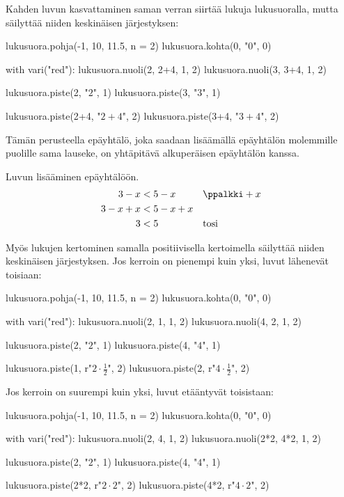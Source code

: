 Kahden luvun kasvattaminen saman verran siirtää lukuja lukusuoralla, mutta säilyttää niiden keskinäisen järjestyksen:

\begin{kuva}
lukusuora.pohja(-1, 10, 11.5, n = 2)
lukusuora.kohta(0, "$0$", 0)

with vari("red"):
	lukusuora.nuoli(2, 2+4, 1, 2)
	lukusuora.nuoli(3, 3+4, 1, 2)

lukusuora.piste(2, "$2$", 1)
lukusuora.piste(3, "$3$", 1)

lukusuora.piste(2+4, "$2\!+\!4$", 2)
lukusuora.piste(3+4, "$3\!+\!4$", 2)
\end{kuva}

Tämän perusteella epäyhtälö, joka saadaan lisäämällä epäyhtälön molemmille puolille sama lauseke, on yhtäpitävä alkuperäisen epäyhtälön kanssa.

\begin{esimerkki}
Luvun lisääminen epäyhtälöön.
  \begin{align*}
     3 - x &< 5 - x && \ppalkki +x\\
     3 -x +x &< 5 -x +x \\
     3 &< 5 && \textrm{tosi}
  \end{align*}
\end{esimerkki}

Myös lukujen kertominen samalla positiivisella kertoimella säilyttää niiden keskinäisen järjestyksen. Jos kerroin on pienempi kuin yksi, luvut lähenevät toisiaan:

\begin{kuva}
lukusuora.pohja(-1, 10, 11.5, n = 2)
lukusuora.kohta(0, "$0$", 0)

with vari("red"):
	lukusuora.nuoli(2, 1, 1, 2)
	lukusuora.nuoli(4, 2, 1, 2)

lukusuora.piste(2, "$2$", 1)
lukusuora.piste(4, "$4$", 1)

lukusuora.piste(1, r"$2 \cdot \frac{1}{2}$", 2)
lukusuora.piste(2, r"$4 \cdot \frac{1}{2}$", 2)
\end{kuva}

Jos kerroin on suurempi kuin yksi, luvut etääntyvät toisistaan:

\begin{kuva}
lukusuora.pohja(-1, 10, 11.5, n = 2)
lukusuora.kohta(0, "$0$", 0)

with vari("red"):
	lukusuora.nuoli(2, 4, 1, 2)
	lukusuora.nuoli(2*2, 4*2, 1, 2)

lukusuora.piste(2, "$2$", 1)
lukusuora.piste(4, "$4$", 1)

lukusuora.piste(2*2, r"$2 \cdot 2$", 2)
lukusuora.piste(4*2, r"$4 \cdot 2$", 2)
\end{kuva}

